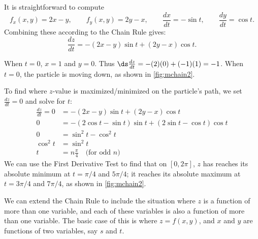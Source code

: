 {It is straightforward to compute
\[f_x(x,y) = 2x-y,\qquad f_y(x,y) = 2y-x,\qquad \frac{dx}{dt} = -\sin t,\qquad \frac{dy}{dt} = \cos t.\]
Combining these according to the Chain Rule gives:
\[\frac{dz}{dt} = -(2x-y)\sin t + (2y-x)\cos t.\]

When $t=0$, $x=1$ and $y=0$. Thus $\ds\frac{dz}{dt} = -(2)(0)+ (-1)(1) = -1$. When $t=0$, the particle is moving down, as shown in \autoref{fig:mchain2}. 


To find where $z$-value is maximized/minimized on the particle's path, we set $\frac{dz}{dt}=0$ and solve for $t$:
\begin{align*}
\frac{dz}{dt} =0
	&= -(2x-y)\sin t + (2y-x)\cos t\\
	0&= -(2\cos t-\sin t)\sin t+(2\sin t-\cos t)\cos t\\
	0&= \sin^2t-\cos^2t\\
\cos^2t &=\sin^2t\\
	t&= n\frac{\pi}4\quad \text{(for odd $n$)}
\end{align*}
We can use the First Derivative Test to find that on $[0,2\pi]$, $z$ has reaches its absolute minimum at $t=\pi/4$ and $5\pi/4$; it reaches its absolute maximum at $t=3\pi/4$ and $7\pi/4$, as shown in \autoref{fig:mchain2}.}


We can extend the Chain Rule to include the situation where $z$ is a function of more than one variable, and each of these variables is also a function of more than one variable. The basic case of this is where $z=f(x,y)$, and $x$ and $y$ are functions of two variables, say $s$ and $t$.


